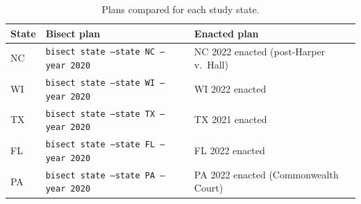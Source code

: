 \begin{table}[h]
\centering\small
\caption{Plans compared for each study state.}
\label{tab:plans-compared}
\begin{tabular}{lll}
\toprule
State & Bisect plan & Enacted plan \\
\midrule
NC & \texttt{bisect state --state NC --year 2020} & NC 2022 enacted (post-Harper v.\ Hall) \\
WI & \texttt{bisect state --state WI --year 2020} & WI 2022 enacted \\
TX & \texttt{bisect state --state TX --year 2020} & TX 2021 enacted \\
FL & \texttt{bisect state --state FL --year 2020} & FL 2022 enacted \\
PA & \texttt{bisect state --state PA --year 2020} & PA 2022 enacted (Commonwealth Court) \\
\bottomrule
\end{tabular}
\end{table}
